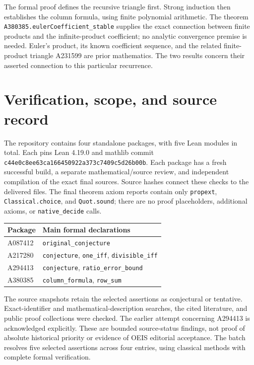 \documentclass[11pt]{article}
\begin{document}
The formal proof defines the recursive triangle first. Strong induction
then establishes the column formula, using finite polynomial arithmetic.
The theorem \texttt{A380385.eulerCoefficient\_stable} supplies the exact
connection between finite products and the infinite-product coefficient;
no analytic convergence premise is needed. Euler's product, its known
coefficient sequence, and the related finite-product triangle A231599 are
prior mathematics. The two results concern their asserted connection to
this particular recurrence.

\section{Verification, scope, and source record}

The repository contains four standalone packages, with five Lean modules
in total. Each pins Lean 4.19.0 and mathlib commit
\texttt{c44e0c8ee63ca166450922a373c7409c5d26b00b}. Each package has a fresh
successful build, a separate mathematical/source review, and independent
compilation of the exact final sources. Source hashes connect these checks
to the delivered files. The final theorem axiom reports contain only
\texttt{propext}, \texttt{Classical.choice}, and \texttt{Quot.sound}; there
are no proof placeholders, additional axioms, or \texttt{native\_decide}
calls.

\begin{center}
\begin{tabular}{@{}ll@{}}
\toprule
Package & Main formal declarations\\
\midrule
A087412 & \texttt{original\_conjecture}\\
A217280 & \texttt{conjecture}, \texttt{one\_iff}, \texttt{divisible\_iff}\\
A294413 & \texttt{conjecture}, \texttt{ratio\_error\_bound}\\
A380385 & \texttt{column\_formula}, \texttt{row\_sum}\\
\bottomrule
\end{tabular}
\end{center}

The source snapshots retain the selected assertions as conjectural or
tentative. Exact-identifier and mathematical-description searches, the
cited literature, and public proof collections were checked. The earlier
attempt concerning A294413 is acknowledged explicitly. These are bounded
source-status findings, not proof of absolute historical priority or
evidence of OEIS editorial acceptance. The batch resolves five selected
assertions across four entries, using classical methods with complete
formal verification.
\end{document}
